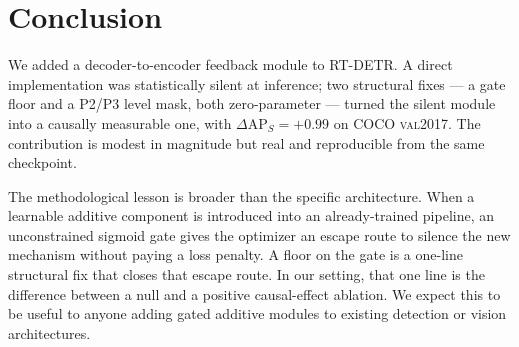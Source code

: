 \section{Conclusion}
\label{sec:conclusion}

We added a decoder-to-encoder feedback module to RT-DETR. A direct implementation was statistically silent at inference; two structural fixes --- a gate floor and a P2/P3 level mask, both zero-parameter --- turned the silent module into a causally measurable one, with $\Delta\mathrm{AP}_S = +0.99$ on COCO \textsc{val2017}. The contribution is modest in magnitude but real and reproducible from the same checkpoint.

The methodological lesson is broader than the specific architecture. When a learnable additive component is introduced into an already-trained pipeline, an unconstrained sigmoid gate gives the optimizer an escape route to silence the new mechanism without paying a loss penalty. A floor on the gate is a one-line structural fix that closes that escape route. In our setting, that one line is the difference between a null and a positive causal-effect ablation. We expect this to be useful to anyone adding gated additive modules to existing detection or vision architectures.
